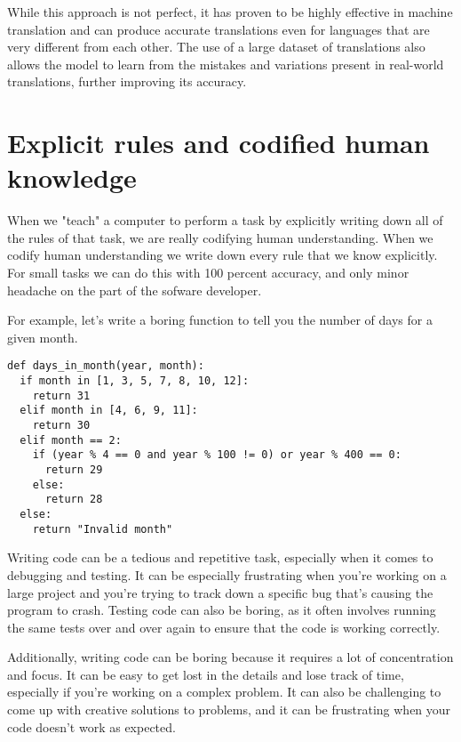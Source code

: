 While this approach is not perfect, it has proven to be highly effective in machine translation and can produce accurate translations even for languages that are very different from each other. The use of a large dataset of translations also allows the model to learn from the mistakes and variations present in real-world translations, further improving its accuracy.

\section{Explicit rules and codified human knowledge}

When we "teach" a computer to perform a task by explicitly writing down all of the rules of that task, we are really codifying human understanding. When we codify human understanding we write down every rule that we know explicitly. For small tasks we can do this with 100 percent accuracy, and only minor headache on the part of the sofware developer. 

For example, let's write a boring function to tell you the number of days for a given month. 

\begin{lstlisting}[style=kaolstplain,linewidth=1.5\textwidth]
def days_in_month(year, month):
  if month in [1, 3, 5, 7, 8, 10, 12]:
    return 31
  elif month in [4, 6, 9, 11]:
    return 30
  elif month == 2:
    if (year % 4 == 0 and year % 100 != 0) or year % 400 == 0:
      return 29
    else:
      return 28
  else:
    return "Invalid month"

\end{lstlisting}


Writing code can be a tedious and repetitive task, especially when it comes to debugging and testing. It can be especially frustrating when you're working on a large project and you're trying to track down a specific bug that's causing the program to crash. Testing code can also be boring, as it often involves running the same tests over and over again to ensure that the code is working correctly.

Additionally, writing code can be boring because it requires a lot of concentration and focus. It can be easy to get lost in the details and lose track of time, especially if you're working on a complex problem. It can also be challenging to come up with creative solutions to problems, and it can be frustrating when your code doesn't work as expected.

